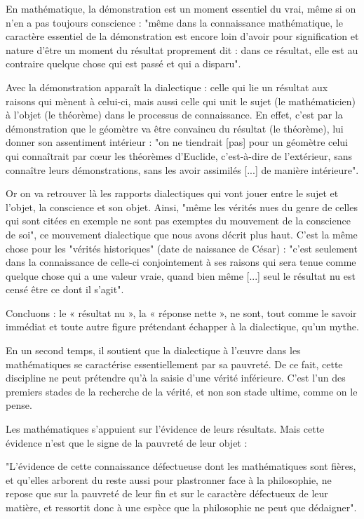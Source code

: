 En mathématique, la démonstration est un moment essentiel du vrai, même si on n’en a pas toujours conscience : "même dans la connaissance mathématique, le caractère essentiel de la démonstration est encore loin d’avoir pour signification et nature d’être un moment du résultat proprement dit : dans ce résultat, elle est au contraire quelque chose qui est passé et qui a disparu".

Avec la démonstration apparaît la dialectique : celle qui lie un résultat aux raisons qui mènent à celui-ci, mais aussi celle qui unit le sujet (le mathématicien) à l’objet (le théorème) dans le processus de connaissance. En effet, c’est par la démonstration que le géomètre va être convaincu du résultat (le théorème), lui donner son assentiment intérieur : "on ne tiendrait [pas] pour un géomètre celui qui connaîtrait par cœur les théorèmes d’Euclide, c’est-à-dire de l’extérieur, sans connaître leurs démonstrations, sans les avoir assimilés [...] de manière intérieure".

Or on va retrouver là les rapports dialectiques qui vont jouer entre le sujet et l’objet, la conscience et son objet. Ainsi, "même les vérités nues du genre de celles qui sont citées en exemple ne sont pas exemptes du mouvement de la conscience de soi", ce mouvement dialectique que nous avons décrit plus haut. C’est la même chose pour les "vérités historiques" (date de naissance de César) : "c’est seulement dans la connaissance de celle-ci conjointement à ses raisons qui sera tenue comme quelque chose qui a une valeur vraie, quand bien même [...] seul le résultat nu est censé être ce dont il s’agit".

Concluons : le « résultat nu », la « réponse nette », ne sont, tout comme le savoir immédiat et toute autre figure prétendant échapper à la dialectique, qu’un mythe.

En un second temps, il soutient que la dialectique à l’œuvre dans les mathématiques se caractérise essentiellement par sa pauvreté. De ce fait, cette discipline ne peut prétendre qu’à la saisie d’une vérité inférieure. C’est l’un des premiers stades de la recherche de la vérité, et non son stade ultime, comme on le pense.

Les mathématiques s’appuient sur l’évidence de leurs résultats. Mais cette évidence n’est que le signe de la pauvreté de leur objet :

"L’évidence de cette connaissance défectueuse dont les mathématiques sont fières, et qu’elles arborent du reste aussi pour plastronner face à la philosophie, ne repose que sur la pauvreté de leur fin et sur le caractère défectueux de leur matière, et ressortit donc à une espèce que la philosophie ne peut que dédaigner".


